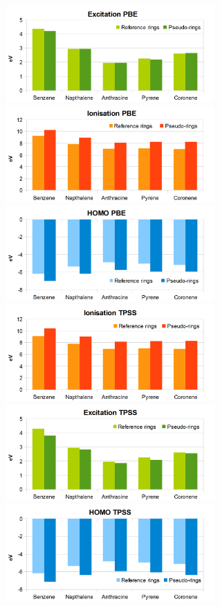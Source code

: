 \documentclass[journal=jctcce,manuscript=article]{achemso}
\begin{document}
\begin{figure}[h]
\includegraphics[width=8cm]{ring_pbe_excitation}
\includegraphics[width=8cm]{ring_pbe_ionisation}
\includegraphics[width=8cm]{ring_pbe_homo}
\includegraphics[width=8cm]{ring_tpss_ionisation}
\includegraphics[width=8cm]{ring_tpss_excitation}
\includegraphics[width=8cm]{ring_tpss_homo}

\end{figure}
\end{document}
